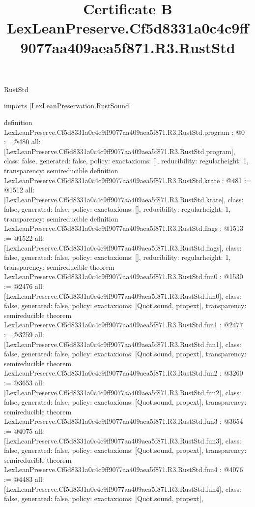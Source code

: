 \begin{lexlean}{RustStd}
\title{Certificate B LexLeanPreserve.Cf5d8331a0c4c9ff9077aa409aea5f871.R3.RustStd}
\begin{coremodule}
imports [LexLeanPreservation.RustSound]

definition LexLeanPreserve.Cf5d8331a0c4c9ff9077aa409aea5f871.R3.RustStd.program : @0 := @480 {
  all: [LexLeanPreserve.Cf5d8331a0c4c9ff9077aa409aea5f871.R3.RustStd.program],
  class: false,
  generated: false,
  policy: exact{axioms: []},
  reducibility: regular{height: 1},
  transparency: semireducible
}
definition LexLeanPreserve.Cf5d8331a0c4c9ff9077aa409aea5f871.R3.RustStd.krate : @481 := @1512 {
  all: [LexLeanPreserve.Cf5d8331a0c4c9ff9077aa409aea5f871.R3.RustStd.krate],
  class: false,
  generated: false,
  policy: exact{axioms: []},
  reducibility: regular{height: 1},
  transparency: semireducible
}
definition LexLeanPreserve.Cf5d8331a0c4c9ff9077aa409aea5f871.R3.RustStd.flags : @1513 := @1522 {
  all: [LexLeanPreserve.Cf5d8331a0c4c9ff9077aa409aea5f871.R3.RustStd.flags],
  class: false,
  generated: false,
  policy: exact{axioms: []},
  reducibility: regular{height: 1},
  transparency: semireducible
}
theorem LexLeanPreserve.Cf5d8331a0c4c9ff9077aa409aea5f871.R3.RustStd.fun0 : @1530 := @2476 {
  all: [LexLeanPreserve.Cf5d8331a0c4c9ff9077aa409aea5f871.R3.RustStd.fun0],
  class: false,
  generated: false,
  policy: exact{axioms: [Quot.sound, propext]},
  transparency: semireducible
}
theorem LexLeanPreserve.Cf5d8331a0c4c9ff9077aa409aea5f871.R3.RustStd.fun1 : @2477 := @3259 {
  all: [LexLeanPreserve.Cf5d8331a0c4c9ff9077aa409aea5f871.R3.RustStd.fun1],
  class: false,
  generated: false,
  policy: exact{axioms: [Quot.sound, propext]},
  transparency: semireducible
}
theorem LexLeanPreserve.Cf5d8331a0c4c9ff9077aa409aea5f871.R3.RustStd.fun2 : @3260 := @3653 {
  all: [LexLeanPreserve.Cf5d8331a0c4c9ff9077aa409aea5f871.R3.RustStd.fun2],
  class: false,
  generated: false,
  policy: exact{axioms: [Quot.sound, propext]},
  transparency: semireducible
}
theorem LexLeanPreserve.Cf5d8331a0c4c9ff9077aa409aea5f871.R3.RustStd.fun3 : @3654 := @4075 {
  all: [LexLeanPreserve.Cf5d8331a0c4c9ff9077aa409aea5f871.R3.RustStd.fun3],
  class: false,
  generated: false,
  policy: exact{axioms: [Quot.sound, propext]},
  transparency: semireducible
}
theorem LexLeanPreserve.Cf5d8331a0c4c9ff9077aa409aea5f871.R3.RustStd.fun4 : @4076 := @4483 {
  all: [LexLeanPreserve.Cf5d8331a0c4c9ff9077aa409aea5f871.R3.RustStd.fun4],
  class: false,
  generated: false,
  policy: exact{axioms: [Quot.sound, propext]},
}
\end{coremodule}
\end{lexlean}
